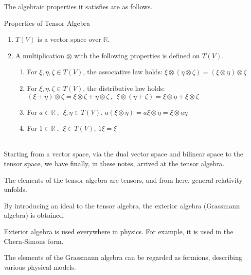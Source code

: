 \documentclass[uplatex,a4j,12pt,dvipdfmx]{jsarticle}
\begin{document}
The algebraic properties it satisfies are as follows.

\begin{itembox}[l]{Properties of Tensor Algebra}
	\begin{enumerate}
		\item $T(V)$ is a vector space over $\mathbb{R}$.
		\item A multiplication $\otimes$ with the following properties is defined on $T(V)$.
		      \begin{enumerate}
			      \item For $\xi,\eta,\zeta \in T(V)$, the associative law holds: $\xi \otimes (\eta \otimes \zeta) = (\xi \otimes \eta) \otimes \zeta$
			      \item For $\xi,\eta,\zeta \in T(V)$, the distributive law holds: $(\xi + \eta) \otimes \zeta = \xi \otimes \zeta + \eta \otimes \zeta \ , \ \ \xi \otimes (\eta + \zeta) = \xi \otimes \eta + \xi \otimes \zeta$
			      \item For $a \in \mathbb{R} \ , \ \ \xi,\eta \in T(V)$, $a (\xi \otimes \eta) = a \xi \otimes \eta = \xi \otimes a \eta$
			      \item For $1 \in \mathbb{R} \ , \ \ \xi \in T(V)$, $1\xi=\xi$
		      \end{enumerate}
	\end{enumerate}
\end{itembox}

\ \\

Starting from a vector space, via the dual vector space and bilinear space to the tensor space, we have finally, in these notes, arrived at the tensor algebra.

The elements of the tensor algebra are tensors, and from here, general relativity unfolds.

By introducing an ideal to the tensor algebra, the exterior algebra (Grassmann algebra) is obtained.

Exterior algebra is used everywhere in physics.
For example, it is used in the Chern-Simons form.

The elements of the Grassmann algebra can be regarded as fermions, describing various physical models.
\end{document}
